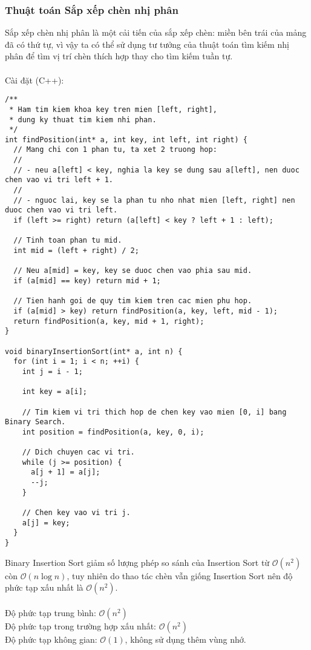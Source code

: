 \documentclass[]{article}
\begin{document}
\subsubsection{Thuật toán Sắp xếp chèn nhị phân}
Sắp xếp chèn nhị phân là một cải tiến của sắp xếp chèn: miền bên trái của mảng đã có thứ tự, vì vậy ta có thể sử dụng tư tưởng của thuật toán tìm kiếm nhị phân để tìm vị trí chèn thích hợp thay cho tìm kiếm tuần tự.
\\\\
Cài đặt (C++):
\begin{lstlisting}
/**
 * Ham tim kiem khoa key tren mien [left, right],
 * dung ky thuat tim kiem nhi phan.
 */
int findPosition(int* a, int key, int left, int right) {
  // Mang chi con 1 phan tu, ta xet 2 truong hop:
  //
  // - neu a[left] < key, nghia la key se dung sau a[left], nen duoc chen vao vi tri left + 1.
  //
  // - nguoc lai, key se la phan tu nho nhat mien [left, right] nen duoc chen vao vi tri left.
  if (left >= right) return (a[left] < key ? left + 1 : left);

  // Tinh toan phan tu mid.
  int mid = (left + right) / 2;

  // Neu a[mid] = key, key se duoc chen vao phia sau mid.
  if (a[mid] == key) return mid + 1;

  // Tien hanh goi de quy tim kiem tren cac mien phu hop.
  if (a[mid] > key) return findPosition(a, key, left, mid - 1);
  return findPosition(a, key, mid + 1, right);
}

void binaryInsertionSort(int* a, int n) {
  for (int i = 1; i < n; ++i) {
    int j = i - 1;

    int key = a[i];

    // Tim kiem vi tri thich hop de chen key vao mien [0, i] bang Binary Search.
    int position = findPosition(a, key, 0, i);

    // Dich chuyen cac vi tri.
    while (j >= position) {
      a[j + 1] = a[j];
      --j;
    }

    // Chen key vao vi tri j.
    a[j] = key;
  }
}
\end{lstlisting}Binary Insertion Sort giảm số lượng phép so sánh của Insertion Sort từ $\mathcal{O}(n^2)$ còn $\mathcal{O}(n \log n)$, tuy nhiên do thao tác chèn vẫn giống Insertion Sort nên độ phức tạp xấu nhất là $\mathcal{O}(n^2)$.
\\\\
Độ phức tạp trung bình: $\mathcal{O}(n^2)$
\\
Độ phức tạp trong trường hợp xấu nhất: $\mathcal{O}(n^2)$
\\
Độ phức tạp không gian: $\mathcal{O}(1)$, không sử dụng thêm vùng nhớ.
\end{document}
